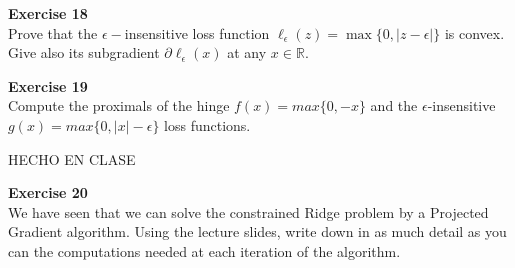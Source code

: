 \documentclass[11pt,table]{article}
\newenvironment{problem}[2][Exercise]
{ \begin{mdframed}[backgroundcolor=gray!20] \textbf{#1 #2} \\}
	{  \end{mdframed}}
\newcommand\abs[1]{\lvert#1\rvert}
\newcommand\R{\mathbb R}
\begin{document}
	\begin{problem}{18}
		Prove that the \(\epsilon-\)insensitive loss function \(\ell_\epsilon(z) = \max\{0,\abs{z - \epsilon}\}\) is convex. Give also its subgradient \(\partial \ell_\epsilon(x)\) at any \(x \in \R\).
	\end{problem}
	
	
	
	
	\begin{problem}{19}
		Compute the proximals of the hinge \( f(x) = max\{0, -x\}  \) and the \( \epsilon \)-insensitive \( g(x)=max\{0, |x| - \epsilon\} \) loss functions.
	\end{problem}
	
	HECHO EN CLASE\\
	
	\begin{problem}{20}
		We have seen that we can solve the constrained Ridge problem by a Projected Gradient algorithm. Using the lecture slides, write down in as much detail as you can the computations needed at each iteration of the algorithm.
	\end{problem}
	
\end{document}

